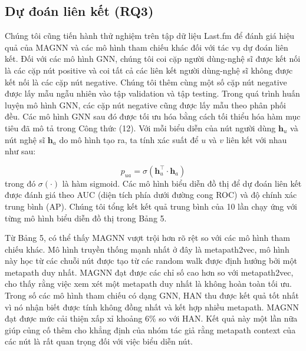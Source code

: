 \subsection{Dự đoán liên kết (RQ3)}
Chúng tôi cũng tiến hành thử nghiệm trên tập dữ liệu Last.fm để đánh giá hiệu quả của MAGNN và các mô hình tham chiếu khác đối với tác vụ dự đoán liên kết. Đối với các mô hình GNN, chúng tôi coi cặp người dùng-nghệ sĩ được kết nối là các cặp nút positive và coi tất cả các liên kết người dùng-nghệ sĩ không được kết nối là các cặp nút negative. Chúng tôi thêm cùng một số cặp nút negative được lấy mẫu ngẫu nhiên vào tập validation và tập testing. Trong quá trình huấn luyện mô hình GNN, các cặp nút negative cũng được lấy mẫu theo phân phối đều. Các mô hình GNN sau đó được tối ưu hóa bằng cách tối thiểu hóa hàm mục tiêu đã mô tả trong Công thức (12). Với mỗi biểu diễn của nút người dùng $\mathbf{h}_{u}$ và nút nghệ sĩ $\mathbf{h}_{a}$ 
do mô hình tạo ra, ta tính xác suất để $u$ và $v$ liên kết với nhau như sau:

\begin{equation}
  p_{u a}=\sigma\left(\mathbf{h}_{u}^{\top} \cdot \mathbf{h}_{a}\right)
\end{equation}
trong đó $\sigma(\cdot)$ là hàm sigmoid. Các mô hình biểu diễn đồ thị để dự đoán liên kết được đánh giá theo AUC (diện tích phía dưới đường cong ROC) và độ chính xác trung bình (AP). Chúng tôi tổng kết kết quả trung bình của 10 lần chạy ứng với từng mô hình biểu diễn đồ thị trong Bảng 5. 

Từ Bảng 5, có thể thấy MAGNN vượt trội hơn rõ rệt so với các mô hình tham chiếu khác. Mô hình truyền thống mạnh nhất ở đây là metapath2vec, mô hình này học từ các chuỗi nút được tạo từ các random walk được định hướng bởi một metapath duy nhất. MAGNN đạt được các chỉ số cao hơn so với metapath2vec, cho thấy rằng việc xem xét một metapath duy nhất là không hoàn toàn tối ưu. Trong số các mô hình tham chiếu có dạng GNN, HAN thu được kết quả tốt nhất vì nó nhận biết được tính không đồng nhất và kết hợp nhiều metapath. MAGNN đạt được mức cải thiện xấp xỉ khoảng $6 \%$ so với HAN. Kết quả này một lần nữa giúp củng cố thêm cho khẳng định của nhóm tác giả rằng  metapath context của các nút là rất quan trọng đối với việc biểu diễn nút.

